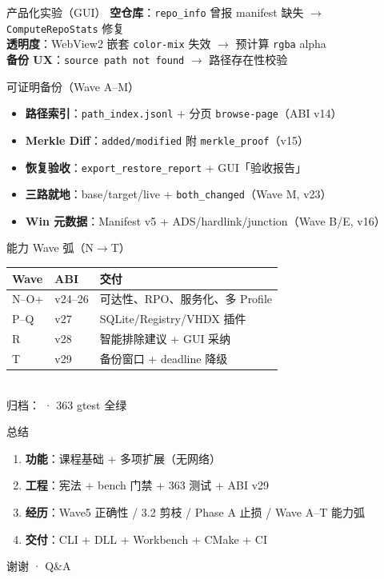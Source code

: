 \documentclass[aspectratio=169,12pt,fontset=none]{ctexbeamer}
\begin{document}
\begin{frame}{产品化实验（GUI）}
  \textbf{空仓库}：\texttt{repo\_info} 曾报 manifest 缺失 $\rightarrow$ \texttt{ComputeRepoStats} 修复\\
  \textbf{透明度}：WebView2 嵌套 \texttt{color-mix} 失效 $\rightarrow$ 预计算 \texttt{rgba} alpha\\
  \textbf{备份 UX}：\texttt{source path not found} $\rightarrow$ 路径存在性校验
\end{frame}

\begin{frame}{可证明备份（Wave A--M）}
  \begin{itemize}
    \item \textbf{路径索引}：\texttt{path\_index.jsonl} + 分页 \texttt{browse-page}（ABI v14）
    \item \textbf{Merkle Diff}：\texttt{added/modified} 附 \texttt{merkle\_proof}（v15）
    \item \textbf{恢复验收}：\texttt{export\_restore\_report} + GUI「验收报告」
    \item \textbf{三路就地}：base/target/live + \texttt{both\_changed}（Wave M, v23）
    \item \textbf{Win 元数据}：Manifest v5 + ADS/hardlink/junction（Wave B/E, v16）
  \end{itemize}
\end{frame}

\begin{frame}{能力 Wave 弧（N$\rightarrow$T）}
  \small
  \begin{tabular}{@{}llp{7.5cm}@{}}
  \toprule
  Wave & ABI & 交付 \\
  \midrule
  N--O+ & v24--26 & 可达性、RPO、服务化、多 Profile \\
  P--Q & v27 & SQLite/Registry/VHDX 插件 \\
  R & v28 & 智能排除建议 + GUI 采纳 \\
  T & v29 & 备份窗口 + deadline 降级 \\
  \bottomrule
  \end{tabular}
  \vspace{0.4em}\\
  \footnotesize 归档： · 363 gtest 全绿
\end{frame}

\begin{frame}{总结}
  \begin{enumerate}
    \item \textbf{功能}：课程基础 + 多项扩展（无网络）
    \item \textbf{工程}：宪法 + bench 门禁 + 363 测试 + ABI v29
    \item \textbf{经历}：Wave5 正确性 / 3.2 剪枝 / Phase A 止损 / Wave A--T 能力弧
    \item \textbf{交付}：CLI + DLL + Workbench + CMake + CI
  \end{enumerate}
  \vspace{0.5em}
  \centering\Large 谢谢 · Q\&A
\end{frame}
\end{document}
